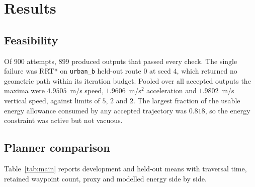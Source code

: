 \documentclass[conference]{IEEEtran}
\begin{document}
\section{Results}
\subsection{Feasibility}
Of $900$ attempts, $899$ produced outputs that passed every check. The single
failure was RRT* on \texttt{urban\_b} held-out route $0$ at seed $4$, which
returned no geometric path within its iteration budget. Pooled over all accepted
outputs the maxima were $4.9505$~m/s speed, $1.9606$~m/s$^2$ acceleration and
$1.9802$~m/s vertical speed, against limits of $5$, $2$ and $2$. The largest
fraction of the usable energy allowance consumed by any accepted trajectory was
$0.818$, so the energy constraint was active but not vacuous.

\subsection{Planner comparison}
Table~\ref{tab:main} reports development and held-out means with traversal time,
retained waypoint count, proxy and modelled energy side by side.
\end{document}
